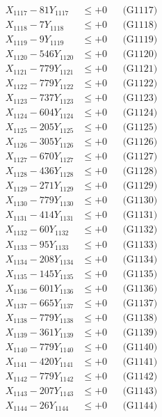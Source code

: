 \documentclass[a4paper,10pt]{article}
\begin{document}
{\begin{align}
X_{1117} - 81Y_{1117} &\leq +0 && \text{(G1117)} \\
X_{1118} - 7Y_{1118} &\leq +0 && \text{(G1118)} \\
X_{1119} - 9Y_{1119} &\leq +0 && \text{(G1119)} \\
X_{1120} - 546Y_{1120} &\leq +0 && \text{(G1120)} \\
\allowbreak
X_{1121} - 779Y_{1121} &\leq +0 && \text{(G1121)} \\
X_{1122} - 779Y_{1122} &\leq +0 && \text{(G1122)} \\
X_{1123} - 737Y_{1123} &\leq +0 && \text{(G1123)} \\
X_{1124} - 604Y_{1124} &\leq +0 && \text{(G1124)} \\
X_{1125} - 205Y_{1125} &\leq +0 && \text{(G1125)} \\
X_{1126} - 305Y_{1126} &\leq +0 && \text{(G1126)} \\
X_{1127} - 670Y_{1127} &\leq +0 && \text{(G1127)} \\
X_{1128} - 436Y_{1128} &\leq +0 && \text{(G1128)} \\
X_{1129} - 271Y_{1129} &\leq +0 && \text{(G1129)} \\
X_{1130} - 779Y_{1130} &\leq +0 && \text{(G1130)} \\
\allowbreak
X_{1131} - 414Y_{1131} &\leq +0 && \text{(G1131)} \\
X_{1132} - 60Y_{1132} &\leq +0 && \text{(G1132)} \\
X_{1133} - 95Y_{1133} &\leq +0 && \text{(G1133)} \\
X_{1134} - 208Y_{1134} &\leq +0 && \text{(G1134)} \\
X_{1135} - 145Y_{1135} &\leq +0 && \text{(G1135)} \\
X_{1136} - 601Y_{1136} &\leq +0 && \text{(G1136)} \\
X_{1137} - 665Y_{1137} &\leq +0 && \text{(G1137)} \\
X_{1138} - 779Y_{1138} &\leq +0 && \text{(G1138)} \\
X_{1139} - 361Y_{1139} &\leq +0 && \text{(G1139)} \\
X_{1140} - 779Y_{1140} &\leq +0 && \text{(G1140)} \\
\allowbreak
X_{1141} - 420Y_{1141} &\leq +0 && \text{(G1141)} \\
X_{1142} - 779Y_{1142} &\leq +0 && \text{(G1142)} \\
X_{1143} - 207Y_{1143} &\leq +0 && \text{(G1143)} \\
X_{1144} - 26Y_{1144} &\leq +0 && \text{(G1144)} \\

\end{align}}
\end{document}
